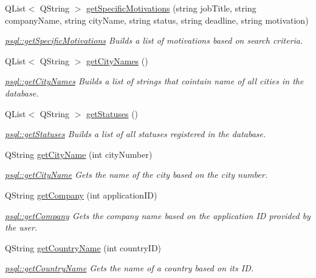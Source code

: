 \begin{DoxyCompactItemize}
Q\+List$<$ Q\+String $>$ \hyperlink{classpsql_a7c86e4ba33784dece1bf897537087a68}{get\+Specific\+Motivations} (string job\+Title, string company\+Name, string city\+Name, string status, string deadline, string motivation)
\begin{DoxyCompactList}\small\item\em \hyperlink{classpsql_a7c86e4ba33784dece1bf897537087a68}{psql\+::get\+Specific\+Motivations} Builds a list of motivations based on search criteria. \end{DoxyCompactList}\item 
Q\+List$<$ Q\+String $>$ \hyperlink{classpsql_a42ee0cf90055ba6a7a6f564cf04d8bb8}{get\+City\+Names} ()
\begin{DoxyCompactList}\small\item\em \hyperlink{classpsql_a42ee0cf90055ba6a7a6f564cf04d8bb8}{psql\+::get\+City\+Names} Builds a list of strings that cointain name of all cities in the database. \end{DoxyCompactList}\item 
Q\+List$<$ Q\+String $>$ \hyperlink{classpsql_a14854d28aabc7e658aea87a7b8b52e5c}{get\+Statuses} ()
\begin{DoxyCompactList}\small\item\em \hyperlink{classpsql_a14854d28aabc7e658aea87a7b8b52e5c}{psql\+::get\+Statuses} Builds a list of all statuses registered in the database. \end{DoxyCompactList}\item 
Q\+String \hyperlink{classpsql_a7acc18034ef60c8a1e69b0e1a15d8ab2}{get\+City\+Name} (int city\+Number)
\begin{DoxyCompactList}\small\item\em \hyperlink{classpsql_a7acc18034ef60c8a1e69b0e1a15d8ab2}{psql\+::get\+City\+Name} Gets the name of the city based on the city number. \end{DoxyCompactList}\item 
Q\+String \hyperlink{classpsql_a09745cd03f09ffb2dacacaab4281915f}{get\+Company} (int application\+ID)
\begin{DoxyCompactList}\small\item\em \hyperlink{classpsql_a09745cd03f09ffb2dacacaab4281915f}{psql\+::get\+Company} Gets the company name based on the application ID provided by the user. \end{DoxyCompactList}\item 
Q\+String \hyperlink{classpsql_a5724e9992e6a5c98524ab73b98f4202d}{get\+Country\+Name} (int country\+ID)
\begin{DoxyCompactList}\small\item\em \hyperlink{classpsql_a5724e9992e6a5c98524ab73b98f4202d}{psql\+::get\+Country\+Name} Gets the name of a country based on its ID. \end{DoxyCompactList}\item 

\end{DoxyCompactItemize}
